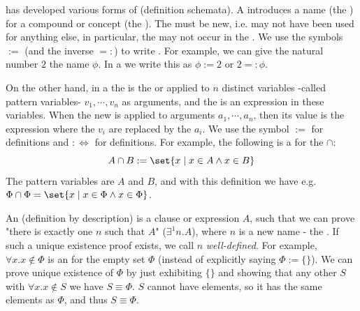  has developed various forms of  (definition schemata). A  introduces a name (the ) for a compound  or concept (the ). The  must be new, i.e. may not have been used for anything else, in particular, the  may not occur in the . We use the symbols $:=$ (and the inverse $=:$) to write . For example, we can give the natural number $2$ the name $\phi$. In a  we write this as $\phi := 2$ or $2 =: \phi$.

On the other hand, in a  the  is the  or  applied to $n$ distinct variables -called pattern variables- $v_1, \cdots, v_n$ as arguments, and the  is an expression in these variables. When the new  is applied to arguments $a_1, \cdots, a_n$, then its value is the  expression where the $v_i$ are replaced by the $a_i$. We use the symbol $:=$ for  definitions and $:\Leftrightarrow$ for  definitions. For example, the following is a  for the  $\cap$:
\[
A \cap B := \set{x \mid x \in A \land x \in B}
\] 
The pattern variables are $A$ and $B$, and with this definition we have e.g. $\Phi \cap \Phi = \set{x \mid x \in \Phi \land x \in \Phi}$.

An  (definition by description) is a clause or expression $A$, such that we can prove "there is exactly one $n$ such that $A$" ($\exists^1 n.A$), where $n$ is a new name - the . If such a unique existence proof exists, we call $n$ \textit{well-defined}. For example, $\forall x.x \notin \Phi$ is an  for the empty set $\Phi$ (instead of explicitly saying $\Phi := \{ \}$). We can prove unique existence of $\Phi$ by just exhibiting $\{ \}$ and showing that any other  $S$ with $\forall x.x \notin S$ we have $S \equiv \Phi$. $S$ cannot have elements, so it has the same elements as $\Phi$, and thus $S \equiv \Phi$.

